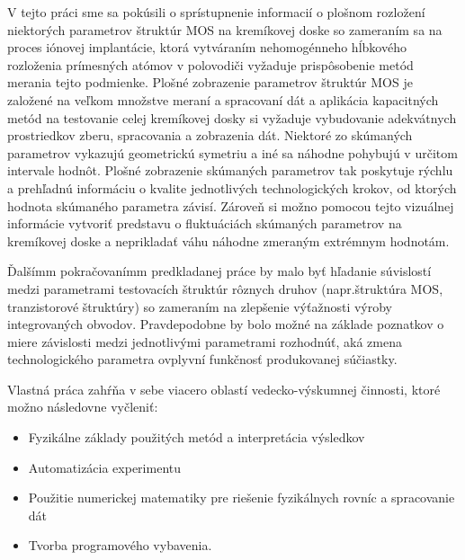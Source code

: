 \par V tejto práci sme sa pokúsili o sprístupnenie informacií o
plošnom rozložení niektorých parametrov štruktúr MOS na kremíkovej
doske so zameraním sa na proces iónovej implantácie, ktorá vytváraním
nehomogénneho hĺbkového rozloženia prímesných atómov v polovodiči
vyžaduje prispôsobenie metód merania tejto podmienke. Plošné
zobrazenie parametrov štruktúr MOS je založené na veľkom množstve
meraní a spracovaní dát a aplikácia kapacitných metód na testovanie
celej kremíkovej dosky si vyžaduje vybudovanie adekvátnych
prostriedkov zberu, spracovania a zobrazenia dát. Niektoré zo
skúmaných parametrov vykazujú geometrickú symetriu a iné sa náhodne
pohybujú v určitom intervale hodnôt. Plošné zobrazenie skúmaných
parametrov tak poskytuje rýchlu a prehľadnú informáciu o kvalite
jednotlivých technologických krokov, od ktorých hodnota skúmaného
parametra závisí. Zároveň si možno pomocou tejto vizuálnej informácie
vytvoriť predstavu o fluktuáciách skúmaných parametrov na kremíkovej
doske a neprikladať váhu náhodne zmeraným extrémnym hodnotám.

\par Ďalšímm pokračovanímm predkladanej práce by malo byť hľadanie
súvislostí medzi parametrami testovacích štruktúr rôznych druhov
(napr.štruktúra MOS, tranzistorové štruktúry) so zameraním na
zlepšenie výťažnosti výroby integrovaných obvodov. Pravdepodobne by
bolo možné na základe poznatkov o miere závislosti medzi jednotlivými
parametrami rozhodnúť, aká zmena technologického parametra ovplyvní
funkčnosť produkovanej súčiastky.

\par Vlastná práca zahŕňa v sebe viacero oblastí vedecko-výskumnej
činnosti, ktoré možno následovne vyčleniť:
\begin{itemize}
\item Fyzikálne základy použitých metód a interpretácia výsledkov
\item Automatizácia experimentu
\item Použitie numerickej  matematiky pre riešenie fyzikálnych rovníc a spracovanie dát
\item Tvorba programového vybavenia.
\end{itemize}

